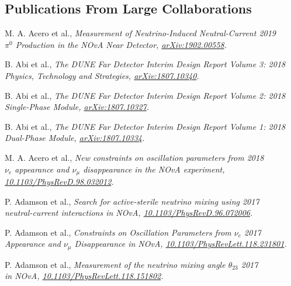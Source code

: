 \documentclass[11pt]{cv}
\begin{document}
\begin{cv}
\section{Publications From Large Collaborations}
\begin{etaremune}
  \item M. A. Acero et al., \it Measurement of Neutrino-Induced Neutral-Current \rm \hfill 2019 \\
  \it $\pi^0$ Production in the NOvA Near Detector, \rm \href{https://arxiv.org/abs/1902.00558}{arXiv:1902.00558}.
  \item B. Abi et al., \it The DUNE Far Detector Interim Design Report Volume 3: \rm \hfill 2018 \\
  \it Physics, Technology and Strategies, \rm \href{https://arxiv.org/abs/1807.10340}{arXiv:1807.10340}.
  \item B. Abi et al., \it The DUNE Far Detector Interim Design Report Volume 2: \rm \hfill 2018 \\
  \it Single-Phase Module, \rm \href{https://arxiv.org/abs/1807.10327}{arXiv:1807.10327}.
  \item B. Abi et al., \it The DUNE Far Detector Interim Design Report Volume 1: \rm \hfill 2018 \\
  \it Dual-Phase Module, \rm \href{https://arxiv.org/abs/1807.10334}{arXiv:1807.10334}.
  \item M. A. Acero et al., \it New constraints on oscillation parameters from \rm \hfill 2018 \\
  \it $\nu_e$ appearance and $\nu_\mu$ disappearance in the NOvA experiment, \rm \\
  \href{https://doi.org/10.1103/PhysRevD.98.032012}{10.1103/PhysRevD.98.032012}.
  \item P. Adamson et al., \it Search for active-sterile neutrino mixing using \rm \hfill 2017 \\
  \it neutral-current interactions in NOvA, \rm \href{https://doi.org/10.1103/PhysRevD.96.072006}{10.1103/PhysRevD.96.072006}.
  \item P. Adamson et al., \it Constraints on Oscillation Parameters from $\nu_e$ \rm \hfill 2017 \\
  \it  Appearance and $\nu_\mu$ Disappearance in NOvA, \rm \href{https://doi.org/10.1103/PhysRevLett.118.231801}{10.1103/PhysRevLett.118.231801}.
  \item P. Adamson et al., \it Measurement of the neutrino mixing angle $\theta_{23}$ \rm \hfill 2017 \\
  \it in NOvA, \rm \href{https://doi.org/10.1103/PhysRevLett.118.151802}{10.1103/PhysRevLett.118.151802}.
\end{etaremune}



\end{cv}
\end{document}
